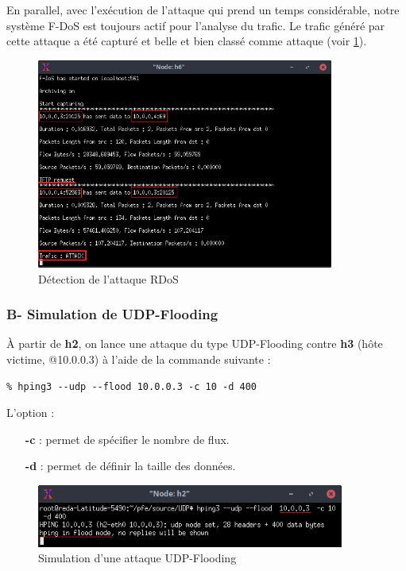 En parallel, avec l'exécution de l'attaque qui prend un temps considérable, notre système F-DoS est toujours actif pour l'analyse du trafic. Le trafic généré par cette attaque a été capturé et belle et bien classé comme attaque (voir \ref{fig:tftpAttack}).
\begin{figure}[h]
\centering
\includegraphics[width=0.87\textwidth]{Figures/simulation/mininet/IDS/attack_tftp}
\decoRule
\caption{Détection de l'attaque RDoS}
\label{fig:tftpAttack}
\end{figure}

\subsubsection{B- Simulation de UDP-Flooding}
À partir de \textbf{h2}, on lance une attaque du type UDP-Flooding contre \textbf{h3} (hôte victime, @10.0.0.3) à l'aide de la commande suivante :
\begin{verbatim}
% hping3 --udp --flood 10.0.0.3 -c 10 -d 400
\end{verbatim}
L'option :
\begin{itemize}
\item[\textbf{-c}]: permet de spécifier le nombre de flux.
\item[\textbf{-d}]: permet de définir la taille des données.
\end{itemize}
\begin{figure}[h]
\centering
\includegraphics[width=0.9\textwidth]{Figures/simulation/mininet/UDP/attack_udp_flood}
\decoRule
\caption{Simulation d'une attaque UDP-Flooding}
\label{fig:FloodingAttackSimulation}
\end{figure}

